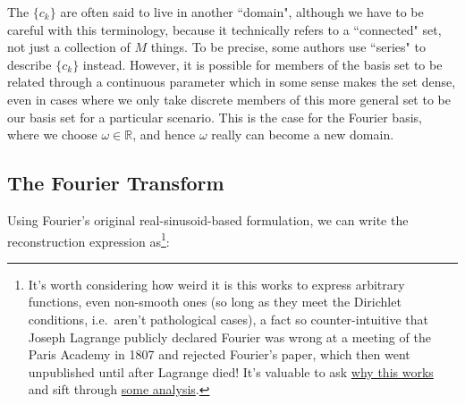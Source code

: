 \documentclass[10pt]{article}
\begin{document}
\begin{center}
\end{center}

The $\{c_k\}$ are often said to live in another ``domain", although we have to be careful with this terminology, because it technically refers to a ``connected" set, not just a collection of $M$ things. To be precise, some authors use ``series" to describe $\{c_k\}$ instead. However, it is possible for members of the basis set to be related through a continuous parameter which in some sense makes the set dense, even in cases where we only take discrete members of this more general set to be our basis set for a particular scenario. This is the case for the Fourier basis, where we choose $\omega \in \mathbb{R}$, and hence $\omega$ really can become a new domain.

\subsection{The Fourier Transform}\label{fourierT}

Using Fourier's original real-sinusoid-based formulation, we can write the reconstruction expression as\footnote{It's worth considering how weird it is this works to express arbitrary functions, even non-smooth ones (so long as they meet the Dirichlet conditions\cite{oppenheim}, i.e.~aren't pathological cases), a fact so counter-intuitive that Joseph Lagrange publicly declared Fourier was wrong at a meeting of the Paris Academy in 1807\cite{michigan} and rejected Fourier's paper, which then went unpublished until after Lagrange died!\cite{oppenheim} It's valuable to ask \href{https://math.stackexchange.com/questions/1105265/why-do-fourier-series-work}{why this works}\cite{why} and sift through \href{https://math.uchicago.edu/~may/REU2017/REUPapers/Xue.pdf}{some analysis}.\cite{chicago}}:
\end{document}
